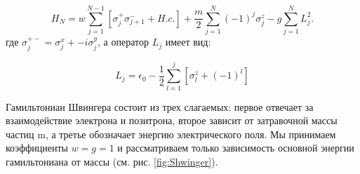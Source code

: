 \documentclass[14pt]{extarticle}
\begin{document}
\begin{equation} 
H_{N} = w \sum_{j=1}^{N-1} [\sigma_{j}^{+} \sigma_{j+1}^{-} + H.c.] + \frac{m}{2} \sum_{j=1}^{N} (-1)^{j} \sigma_{j}^{z} - g \sum_{j=1}^{N} L^{2}_{j}.\label{eq:shwinger}
\end{equation} где $\sigma_{j}^{+-} = \sigma_{j}^{x} +- i\sigma_{j}^{y}$, а оператор $L_{j}$ имеет вид:

\begin{equation}
L_{j} = \epsilon_{0} - \frac{1}{2} \sum_{l=1}^{j} [\sigma_{l}^{z} + (-1)^{l}]
\end{equation}

\qquad Гамильтониан Швингера состоит из трех слагаемых: первое отвечает за взаимодействие электрона и позитрона, второе зависит от затравочной массы частиц m, а третье обозначает энергию электрического поля. Мы принимаем коэффициенты $w = g = 1$ и рассматриваем только зависимость основной энергии гамильтониана от массы (см. рис. \ref{fig:Shwinger}). 
\end{document}
